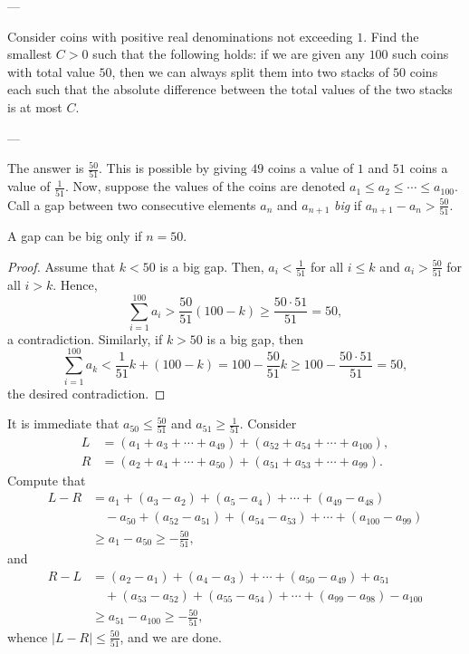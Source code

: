 
---

Consider coins with positive real denominations not exceeding $1$. Find the smallest $C>0$ such that the following holds: if we are given any $100$ such coins with total value $50$, then we can always split them into two stacks of $50$ coins each such that the absolute difference between the total values of the two stacks is at most $C$.

---

The answer is $\tfrac{50}{51}$. This is possible by giving $49$ coins a value of $1$ and $51$ coins a value of $\tfrac1{51}$. Now, suppose the values of the coins are denoted $a_1\le a_2\le\cdots\le a_{100}$. Call a gap between two consecutive elements $a_n$ and $a_{n+1}$ \emph{big} if $a_{n+1}-a_n>\tfrac{50}{51}$.
\begin{iclaim*}
    A gap can be big only if $n=50$.
\end{iclaim*}
\begin{proof}
    Assume that $k<50$ is a big gap. Then, $a_i<\tfrac1{51}$ for all $i\le k$ and $a_i>\tfrac{50}{51}$ for all $i>k$. Hence, $$\sum_{i=1}^{100}a_i>\frac{50}{51}(100-k)\ge\frac{50\cdot51}{51}=50,$$
    a contradiction. Similarly, if $k>50$ is a big gap, then $$\sum_{i=1}^{100}a_k<\frac1{51}k+(100-k)=100-\frac{50}{51}k\ge100-\frac{50\cdot 51}{51}=50,$$
    the desired contradiction.
\end{proof}

It is immediate that $a_{50}\le\tfrac{50}{51}$ and $a_{51}\ge\tfrac1{51}$. Consider
\begin{align*}
    L&=(a_1+a_3+\cdots+a_{49})+(a_{52}+a_{54}+\cdots+a_{100}),\\
    R&=(a_2+a_4+\cdots+a_{50})+(a_{51}+a_{53}+\cdots+a_{99}).
\end{align*}
Compute that
\begin{align*}
    L-R&=a_1+(a_3-a_2)+(a_5-a_4)+\cdots+(a_{49}-a_{48})\\
    &\quad-a_{50}+(a_{52}-a_{51})+(a_{54}-a_{53})+\cdots+(a_{100}-a_{99})\\
    &\ge a_1-a_{50}\ge-\frac{50}{51},
\end{align*}
and
\begin{align*}
    R-L&=(a_2-a_1)+(a_4-a_3)+\cdots+(a_{50}-a_{49})+a_{51}\\
    &\quad+(a_{53}-a_{52})+(a_{55}-a_{54})+\cdots+(a_{99}-a_{98})-a_{100}\\
    &\ge a_{51}-a_{100}\ge-\frac{50}{51},
\end{align*}
whence $|L-R|\le\tfrac{50}{51}$, and we are done.
